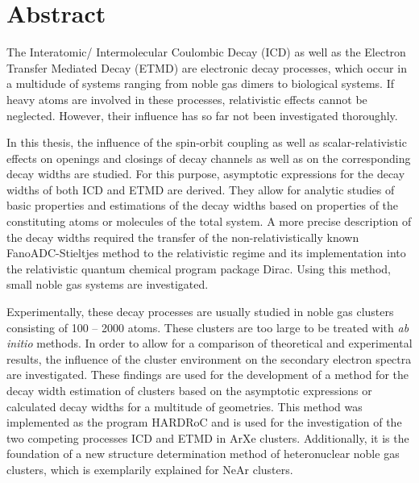 \chapter*{Abstract}
\thispagestyle{empty}
The Interatomic/ Intermolecular Coulombic Decay (ICD) as well as the
Electron Transfer Mediated Decay (ETMD) are electronic decay
processes, which occur in a multidude of systems ranging from
noble gas dimers to biological systems.
If heavy atoms are involved in these processes, relativistic effects
cannot be neglected. However, their influence has so far not
been investigated thoroughly.

In this thesis, the influence of the spin-orbit coupling as well as
scalar-relativistic effects on openings and closings of decay channels as well
as on the corresponding decay widths are studied.
For this purpose, asymptotic expressions for the decay widths of both
ICD and ETMD are derived. They allow for analytic studies of basic
properties and estimations of the decay widths based on properties
of the constituting atoms or molecules of the total system.
A more precise description of the decay widths required the transfer of
the non-relativistically known FanoADC-Stieltjes method to the relativistic
regime and its implementation into the relativistic quantum chemical
program package Dirac. Using this method, small noble gas systems
are investigated. 

Experimentally, these decay processes are usually studied in noble gas
clusters consisting of 100 -- 2000 atoms. These clusters are too
large to be treated with \emph{ab initio} methods. In order to allow
for a comparison of theoretical and experimental results, the influence
of the cluster environment on the secondary electron spectra are
investigated. These findings are used for the development of a method
for the decay width estimation of clusters based on the asymptotic
expressions or calculated decay widths for a multitude of geometries.
This method was implemented as the program HARDRoC and
is used for the investigation of the two competing processes ICD and ETMD in
ArXe clusters. Additionally, it is the foundation of a new
structure determination method of heteronuclear noble gas clusters,
which is exemplarily explained for NeAr clusters.
